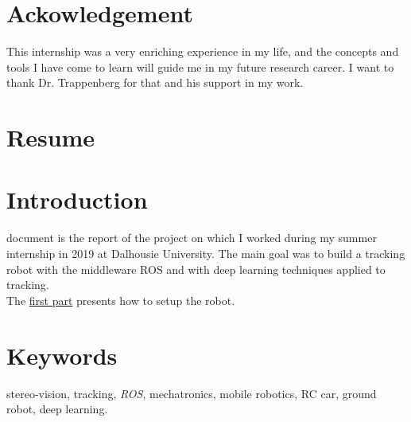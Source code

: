 
\vspace{50pt}

\section*{Ackowledgement}\label{thk}

This internship was a very enriching experience in my life,
and the concepts and tools I have come to learn will 
guide me in my future research career. I want to thank
Dr. Trappenberg for that and his support
in my work.


\clearpage

\section*{Resume}


\clearpage
\section*{Introduction}

 document is the report of the project on which 
I worked during my summer internship in 2019 at Dalhousie 
University. The main goal was to build a tracking robot
with the middleware ROS and with deep learning techniques 
applied to tracking.
\\\indent The \hyperref[setup]{first part} presents how to 
setup the robot.

\section*{Keywords} stereo-vision, tracking, \textit{ROS},
mechatronics, mobile robotics, RC car, ground robot, deep learning.




